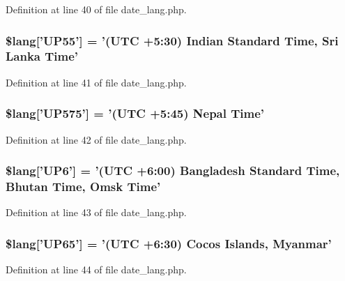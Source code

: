 Definition at line 40 of file date\-\_\-lang.\-php.

\subsubsection[{\$lang}]{\setlength{\rightskip}{0pt plus 5cm}\$lang['U\-P55'] = '(U\-T\-C +5\-:30) Indian Standard Time, Sri Lanka Time'}\label{date__lang_8php_aa55a1ebecdfbd5e0c7e40c921b90cad2}


Definition at line 41 of file date\-\_\-lang.\-php.

\subsubsection[{\$lang}]{\setlength{\rightskip}{0pt plus 5cm}\$lang['U\-P575'] = '(U\-T\-C +5\-:45) Nepal Time'}\label{date__lang_8php_abc4186fc3bc853aa036b5b11eeb52ecd}


Definition at line 42 of file date\-\_\-lang.\-php.

\subsubsection[{\$lang}]{\setlength{\rightskip}{0pt plus 5cm}\$lang['U\-P6'] = '(U\-T\-C +6\-:00) Bangladesh Standard Time, Bhutan Time, Omsk Time'}\label{date__lang_8php_aaa655de76a3be875d9cedbf4a57244fa}


Definition at line 43 of file date\-\_\-lang.\-php.

\subsubsection[{\$lang}]{\setlength{\rightskip}{0pt plus 5cm}\$lang['U\-P65'] = '(U\-T\-C +6\-:30) Cocos Islands, Myanmar'}\label{date__lang_8php_af94f885b6e6c50abdf7672ddfa80774d}


Definition at line 44 of file date\-\_\-lang.\-php.


